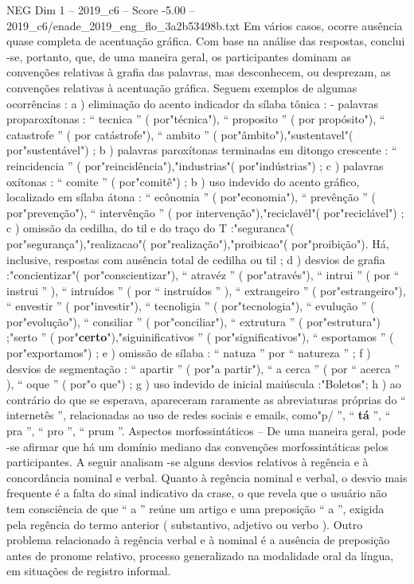 \begin{textsample}{NEG Dim 1 – 2019\_c6 – Score -5.00 – 2019\_c6/enade\_2019\_eng\_flo\_3a2b53498b.txt}
Em vários casos, ocorre ausência quase completa de acentuação gráfica.
Com base na análise das respostas, conclui -se, portanto, que, de uma maneira geral, os participantes dominam as convenções relativas à grafia das palavras, mas desconhecem, ou desprezam, as convenções relativas à acentuação gráfica.
Seguem exemplos de algumas ocorrências : a ) eliminação do acento indicador da sílaba tônica : - palavras proparoxítonas : “ tecnica ” ( por"técnica"), “ proposito ” ( por propósito"), “ catastrofe ” ( por catástrofe"), “ ambito ” ( por"âmbito"),"sustentavel"( por"sustentável") ; b ) palavras paroxítonas terminadas em ditongo crescente : “ reincidencia ” ( por"reincidência"),"industrias"( por"indústrias") ; c ) palavras oxítonas : “ comite ” ( por"comitê") ; b ) uso indevido do acento gráfico, localizado em sílaba átona : “ ecônomia ” ( por"economia"), “ prevênção ” ( por"prevenção"), “ intervênção ” ( por intervenção"),"reciclavél"( por"reciclável") ; c ) omissão da cedilha, do til e do traço do T :"seguranca"( por"segurança"),"realizacao"( por"realização"),"proibicao"( por"proibição").
Há, inclusive, respostas com ausência total de cedilha ou til ; d ) desvios de grafia :"concientizar"( por"conscientizar"), “ atravéz ” ( por"através"), “ intrui ” ( por “ instrui ” ), “ intruídos ” ( por “ instruídos ” ), “ extrangeiro ” ( por"estrangeiro"), “ envestir ” ( por"investir"), “ tecnoligia ” ( por"tecnologia"), “ evulução ” ( por"evolução"), “ consiliar ” ( por"conciliar"), “ extrutura ” ( por"estrutura") ;"serto ” ( por"\textbf{certo}"),"siguinificativos ” ( por"significativos"), “ esportamos ” ( por"exportamos") ; e ) omissão de sílaba : “ natuza ” por “ natureza ” ; f ) desvios de segmentação : “ apartir ” ( por"a partir"), “ a cerca ” ( por “ acerca ” ), “ oque ” ( por"o que") ; g ) uso indevido de inicial maiúscula :"Boletos"; h ) ao contrário do que se esperava, apareceram raramente as abreviaturas próprias do “ internetês ”, relacionadas ao uso de redes sociais e emails, como"p/ ”, “ \textbf{tá} ”, “ pra ”, “ pro ”, “ prum ”.
Aspectos morfossintáticos – De uma maneira geral, pode -se afirmar que há um domínio mediano das convenções morfossintáticas pelos participantes.
A seguir analisam -se alguns desvios relativos à regência e à concordância nominal e verbal.
Quanto à regência nominal e verbal, o desvio mais frequente é a falta do sinal indicativo da crase, o que revela que o usuário não tem consciência de que “ a ” reúne um artigo e uma preposição “ a ”, exigida pela regência do termo anterior ( substantivo, adjetivo ou verbo ).
Outro problema relacionado à regência verbal e à nominal é a ausência de preposição antes de pronome relativo, processo generalizado na modalidade oral da língua, em situações de registro informal.

\end{textsample}
